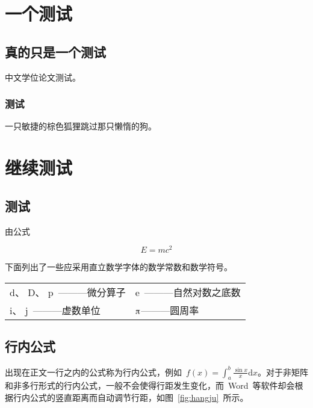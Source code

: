 

\chapter{一个测试}

\section{真的只是一个测试}

中文学位论文测试。

\subsection{测试}

一只敏捷的棕色狐狸跳过那只懒惰的狗。

\chapter{继续测试}

\section{测试}

由公式

\[E = mc^2\]

\noindent 下面列出了一些应采用直立数学字体的数学常数和数学符号。

\vspace{-0.5em}
\begin{center}
\begin{tabularx}{0.7\textwidth}{XX}
$\mathrm{d}$、 $\mathrm{D}$、 $\mathrm{p}$~———微分算子 & $\mathrm{e}$~———自然对数之底数 \\
$\mathrm{i}$、 $\mathrm{j}$~———虚数单位 & $\piup$———圆周率\\
\end{tabularx}
\end{center}

\section{行内公式}

出现在正文一行之内的公式称为行内公式，例如~$f(x)=\int_{a}^{b}\frac{\sin{x}}{x}\mathrm{d}x$。对于非矩阵和非多行形式的行内公式，一般不会使得行距发生变化，而~Word~等软件却会根据行内公式的竖直距离而自动调节行距，如图~\ref{fig:hangju}~所示。


